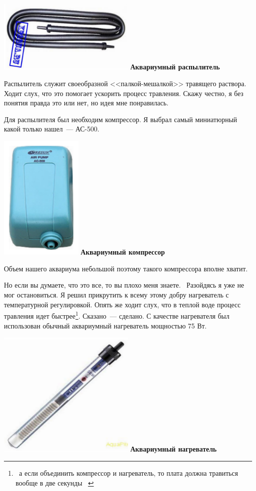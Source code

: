 {\noindent\includegraphics[width=0.5\textwidth]{00/fig/smit/ee000021.png}
\textbf{Аквариумный распылитель}

Распылитель служит своеобразной <<палкой-мешалкой>> травящего
раствора. Ходит слух, что это помогает ускорить процесс травления. Скажу
честно, я без понятия правда это или нет, но идея мне понравилась.

Для распылителя был необходим компрессор. Я выбрал самый
миниатюрный какой только нашел\ --- АС-500.

\noindent\includegraphics[width=0.3\textwidth]{00/fig/smit/ee000022.png}
\textbf{Аквариумный компрессор}

Объем нашего аквариума небольшой поэтому такого компрессора вполне хватит.

Но если вы думаете, что это все, то вы плохо меня знаете. \smiley\ Разойдясь я
уже не мог остановиться. Я решил прикрутить к всему этому добру нагреватель с
температурной регулировкой. Опять же ходит слух, что в теплой воде процесс
травления идет быстрее\footnote{\ а если объединить компрессор и нагреватель, то
плата должна травиться вообще в две секунды \smiley\ }. Сказано\ --- сделано. С
качестве нагревателя был использован обычный аквариумный нагреватель мощностью
75 Вт.

\noindent\includegraphics[width=0.5\textwidth]{00/fig/smit/ee000023.png}
\textbf{Аквариумный нагреватель}

}
